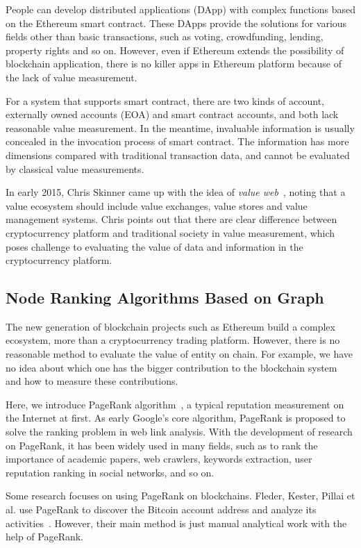 People can develop distributed applications (DApp) with complex functions based on the Ethereum smart contract. These DApps provide the solutions for various fields other than basic transactions, such as voting, crowdfunding, lending, property rights and so on.
However, even if Ethereum extends the possibility of blockchain application, there is no killer apps in Ethereum platform because of the lack of value measurement.

For a system that supports smart contract, there are two kinds of account, externally owned accounts (EOA) and smart contract accounts, and both lack reasonable value measurement. In the meantime, invaluable information is usually concealed in the invocation process of smart contract. The information has more dimensions compared with traditional transaction data, and cannot be evaluated by classical value measurements.

In early 2015, Chris Skinner came up with the idea of \emph{value web}~\cite{ChrisSkinner}, noting that a value ecosystem should include value exchanges, value stores and value management systems. Chris points out that there are clear difference between cryptocurrency platform and traditional society in value measurement, which poses challenge to evaluating the value of data and information in the cryptocurrency platform.

\subsection{Node Ranking Algorithms Based on Graph}
The new generation of blockchain projects such as Ethereum build a complex ecosystem, more than a cryptocurrency trading platform. However, there is no reasonable method to evaluate the value of entity on chain. For example, we have no idea about which one has the bigger contribution to the blockchain system and how to measure these contributions.

Here, we introduce PageRank algorithm~\cite{page1999pagerank}, a typical reputation measurement on the Internet at first. As early Google's core algorithm, PageRank is proposed to solve the ranking problem in web link analysis. With the development of research on PageRank, it has been widely used in many fields, such as to rank the importance of academic papers, web crawlers, keywords extraction, user reputation ranking in social networks, and so on.


Some research focuses on using PageRank on blockchains. Fleder, Kester, Pillai et al. use PageRank to discover the Bitcoin account address and analyze its activities~\cite{Fleder2015}. However, their main method is just manual analytical work with the help of PageRank.

